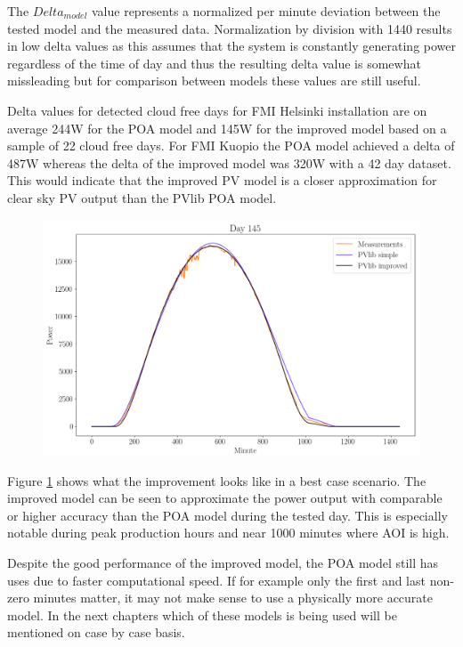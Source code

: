 \noindent The $Delta_{model}$ value represents a normalized per minute deviation between the tested model and the measured data. Normalization by division with 1440 results in low delta values as this assumes that the system is constantly generating power regardless of the time of day and thus the resulting delta value is somewhat missleading but for comparison between models these values are still useful.

Delta values for detected cloud free days for FMI Helsinki installation are on average 244W for the POA model and 145W for the improved model based on a sample of 22 cloud free days. For FMI Kuopio the POA model achieved a delta of 487W whereas the delta of the improved model was 320W with a 42 day dataset. This would indicate that the improved PV model is a closer approximation for clear sky PV output than the PVlib POA model.


\begin{figure}[h]
\centering
\includegraphics[width=0.99\linewidth]{pics/pvlibsimplecomplex}
\label{fig-poa_eval_simplecomplex}
\end{figure}

\noindent Figure \ref{fig-poa_eval_simplecomplex} shows what the improvement looks like in a best case scenario. The improved model can be seen to approximate the power output with comparable or higher accuracy than the POA model during the tested day. This is especially notable during peak production hours and near 1000 minutes where AOI is high.

Despite the good performance of the improved model, the POA model still has uses due to faster computational speed. If for example only the first and last non-zero minutes matter, it may not make sense to use a physically more accurate model. In the next chapters which of these models is being used will be mentioned on case by case basis.



